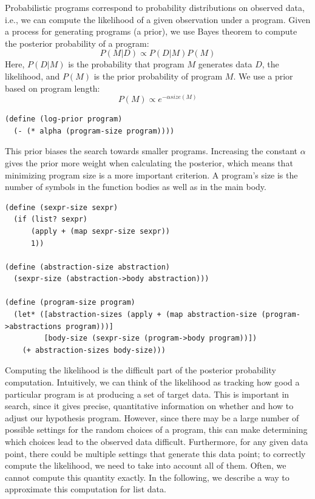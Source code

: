 \documentclass[a4paper,10pt]{article}
\begin{document}
Probabilistic programs correspond to probability distributions on observed data, i.e., we can compute the likelihood of a given observation under a program. Given a process for generating programs (a prior), we use Bayes theorem to compute the posterior probability of a program:
\begin{equation}P(M|D)\propto P(D|M)P(M)\end{equation}
Here, $P(D|M)$ is the probability that program $M$ generates data $D$, the likelihood, and $P(M)$ is the prior probability of program $M$. We use a prior based on program length:
\begin{equation}P(M)\propto e^{-\alpha \mathit{size}(M)}\end{equation}
\begin{lstlisting}[frame=trbl]
(define (log-prior program)
  (- (* alpha (program-size program))))
\end{lstlisting}
This prior biases the search towards smaller programs. Increasing the constant $\alpha$ gives the prior more weight when calculating the posterior, which means that minimizing program size is a more important criterion. A program's size is the number of symbols in the function bodies as well as in the main body.
\begin{lstlisting}[frame=trbl]
(define (sexpr-size sexpr)
  (if (list? sexpr)
      (apply + (map sexpr-size sexpr))
      1))

(define (abstraction-size abstraction)
  (sexpr-size (abstraction->body abstraction)))
  
(define (program-size program)
  (let* ([abstraction-sizes (apply + (map abstraction-size (program->abstractions program)))]
         [body-size (sexpr-size (program->body program))])
    (+ abstraction-sizes body-size)))
\end{lstlisting}
Computing the likelihood is the difficult part of the posterior probability computation. Intuitively, we can think of the likelihood as tracking how good a particular program is at producing a set of target data.  This is important in search, since it gives precise, quantitative information on whether and how to adjust our hypothesis program. However, since there may be a large number of possible settings for the random choices of a program, this can make determining which choices lead to the observed data difficult. Furthermore, for any given data point, there could be multiple settings that generate this data point; to correctly compute the likelihood, we need to take into account all of them. Often, we cannot compute this quantity exactly. In the following, we describe a way to approximate this computation for list data.
\end{document}
